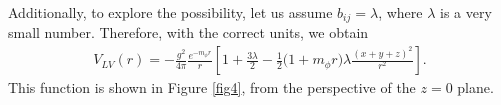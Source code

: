 \documentclass[11pt,showpacs,preprintnumbers,amsmath,amssymb,prd,nofootinbib,superscriptaddress]{revtex4-2}
\begin{document}
{Additionally, to explore the possibility, let us assume $b_{ij} = \lambda$, where $\lambda$ is a very small number. Therefore, with the correct units, we obtain
\begin{eqnarray}
    V_{LV}(r)=-\frac{g^2}{4\pi}\frac{e^{-m_{\phi}r}}{r}\left[1+\frac{3\lambda}{2}-\frac{1}{2}\biggl(1+m_\phi r\biggr)\lambda\frac{(x+y+z)^2}{r^2}\right].\label{eq27}
\end{eqnarray}
This function is shown in Figure \ref{fig4}, from the perspective of the $z=0$ plane.
\begin{figure}[ht]
    \centering

\end{figure}}
\end{document}
